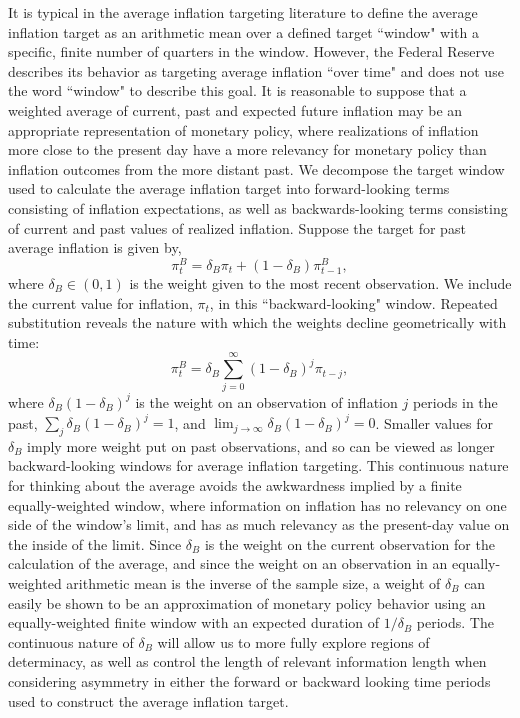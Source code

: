 \documentclass[english,authoryear,12pt]{elsarticle}
\begin{document}
It is typical in the average inflation targeting literature to define the average inflation target as an arithmetic mean over a defined target ``window" with a specific, finite number of quarters in the window. However, the Federal Reserve describes its behavior as targeting average inflation ``over time" and does not use the word ``window" to describe this goal. It is reasonable to suppose that a weighted average of current, past and expected future inflation may be an appropriate representation of monetary policy, where realizations of inflation more close to the present day have a more relevancy for monetary policy than inflation outcomes from the more distant past. We decompose the target window used to calculate the average inflation target into forward-looking terms consisting of inflation expectations, as well as backwards-looking terms consisting of current and past values of realized inflation. Suppose the target for past average inflation is given by,
\begin{equation}\label{eq:backward}
	\pi_t^B = \delta_B \pi_t + (1-\delta_B) \pi_{t-1}^B,
\end{equation}
where $\delta_B \in (0,1)$ is the weight given to the most recent observation. We include the current value for inflation, $\pi_t$, in this ``backward-looking" window.  Repeated substitution reveals the nature with which the weights decline geometrically with time:
\begin{equation}\label{eq:backward_all}
	\pi_t^B = \delta_B \sum_{j=0}^{\infty} (1-\delta_B)^j \pi_{t-j},
\end{equation}
where $\delta_B (1-\delta_B)^j$ is the weight on an observation of inflation $j$ periods in the past, $\sum_j \delta_B (1-\delta_B)^j=1$, and $\lim_{j \to \infty} \delta_B (1-\delta_B)^j=0$. Smaller values for $\delta_B$ imply more weight put on past observations, and so can be viewed as longer backward-looking windows for average inflation targeting. This continuous nature for thinking about the average avoids the awkwardness implied by a finite equally-weighted window, where information on inflation has no relevancy on one side of the window's limit, and has as much relevancy as the present-day value on the inside of the limit. Since $\delta_B$ is the weight on the current observation for the calculation of the average, and since the weight on an observation in an equally-weighted arithmetic mean is the inverse of the sample size, a weight of $\delta_B$ can easily be shown to be an approximation of monetary policy behavior using an equally-weighted finite window with an expected duration of $1 / \delta_B$ periods. The continuous nature of $\delta_B$ will allow us to more fully explore regions of determinacy, as well as control the length of relevant information length when considering asymmetry in either the forward or backward looking time periods used to construct the average inflation target.
\end{document}
